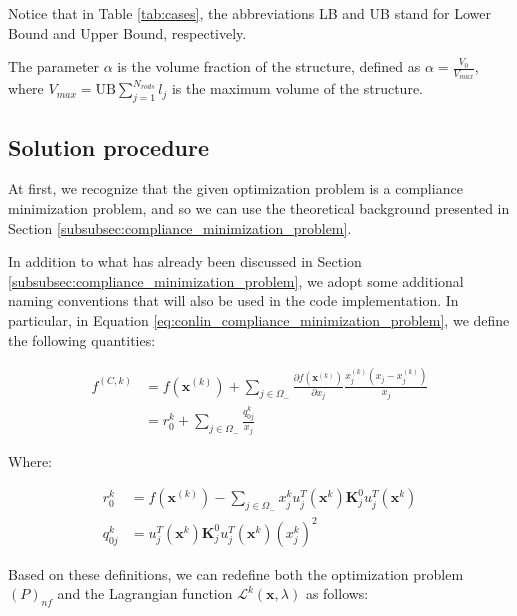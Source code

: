 Notice that in Table \ref{tab:cases}, the abbreviations LB and UB stand for Lower Bound and Upper Bound, respectively.

The parameter $\alpha$ is the volume fraction of the structure, defined as $\alpha = \frac{V_0}{V_{max}}$, where $V_{max} = \text{UB} \sum_{j=1}^{N_{rods}} l_j$ is the maximum volume of the structure.



\subsection{Solution procedure}
\label{subsec:cb_solution_procedure}

At first, we recognize that the given optimization problem is a compliance minimization problem, and so we can use the theoretical background presented in Section \ref{subsubsec:compliance_minimization_problem}.

In addition to what has already been discussed in Section \ref{subsubsec:compliance_minimization_problem}, we adopt some additional naming conventions that will also be used in the code implementation.
In particular, in Equation \ref{eq:conlin_compliance_minimization_problem}, we define the following quantities:

\begin{equation}
    \begin{aligned}
        f^{(C, k)} & = f(\bm{x}^{(k)}) + \sum_{j \in \Omega_-} \frac{\partial f(\bm{x}^{(k)})}{\partial x_j} \frac{x_j^{(k)}(x_j - x_j^{(k)})}{x_j} \\
                   & = r_0^k + \sum_{j \in \Omega_-} \frac{q_{0j}^k}{x_j}
    \end{aligned}
\end{equation}

Where:

\begin{equation}
    \begin{aligned}
        r_0^k    & = f(\bm{x}^{(k)}) - \sum_{j \in \Omega_-}  x_j^k u_j^T(\bm{x}^k) \bm{K}_j^0 u_j^T(\bm{x}^k) \\
        q_{0j}^k & = u_j^T(\bm{x}^k) \bm{K}_j^0 u_j^T(\bm{x}^k) (x_j^k)^2
    \end{aligned}
\end{equation}

Based on these definitions, we can redefine both the optimization problem $(P)_{nf}$ and the Lagrangian function $\mathcal{L}^{k}(\bm{x}, \lambda)$ as follows:

